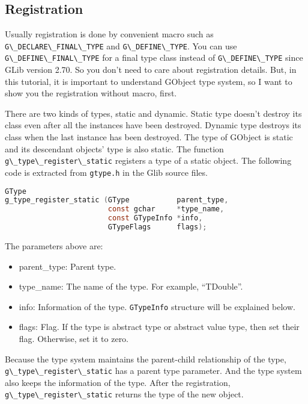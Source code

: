 \subsection{Registration}\label{registration}

Usually registration is done by convenient macro such as
\passthrough{\lstinline!G\_DECLARE\_FINAL\_TYPE!} and
\passthrough{\lstinline!G\_DEFINE\_TYPE!}. You can use
\passthrough{\lstinline!G\_DEFINE\_FINAL\_TYPE!} for a final type class
instead of \passthrough{\lstinline!G\_DEFINE\_TYPE!} since GLib version
2.70. So you don't need to care about registration details. But, in this
tutorial, it is important to understand GObject type system, so I want
to show you the registration without macro, first.

There are two kinds of types, static and dynamic. Static type doesn't
destroy its class even after all the instances have been destroyed.
Dynamic type destroys its class when the last instance has been
destroyed. The type of GObject is static and its descendant objects'
type is also static. The function
\passthrough{\lstinline!g\_type\_register\_static!} registers a type of
a static object. The following code is extracted from
\passthrough{\lstinline!gtype.h!} in the Glib source files.

\begin{lstlisting}[language=C]
GType
g_type_register_static (GType           parent_type,
                        const gchar     *type_name,
                        const GTypeInfo *info,
                        GTypeFlags      flags);
\end{lstlisting}

The parameters above are:

\begin{itemize}
\tightlist
\item
  parent\_type: Parent type.
\item
  type\_name: The name of the type. For example, ``TDouble''.
\item
  info: Information of the type. \passthrough{\lstinline!GTypeInfo!}
  structure will be explained below.
\item
  flags: Flag. If the type is abstract type or abstract value type, then
  set their flag. Otherwise, set it to zero.
\end{itemize}

Because the type system maintains the parent-child relationship of the
type, \passthrough{\lstinline!g\_type\_register\_static!} has a parent
type parameter. And the type system also keeps the information of the
type. After the registration,
\passthrough{\lstinline!g\_type\_register\_static!} returns the type of
the new object.

